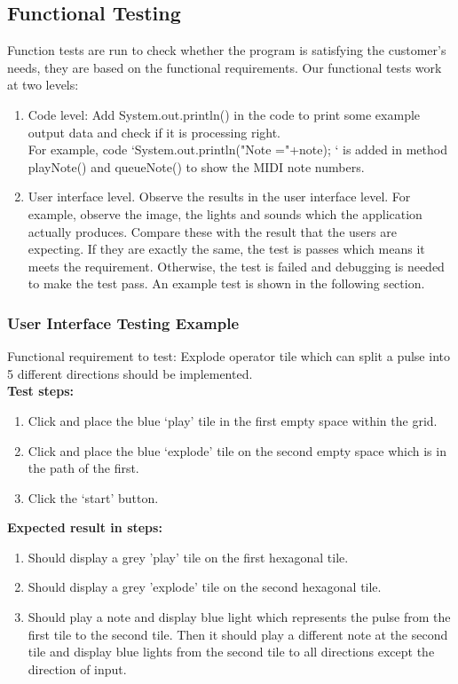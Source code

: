 \documentclass[10pt,a4paper]{article}
\begin{document}
\subsection{Functional Testing}
Function tests are run to check whether the program is satisfying the customer's needs, they are based on the functional requirements. Our functional tests work at two levels:
\begin{enumerate}
\item Code level: Add System.out.println() in the code to print some example output data and check if it is processing right.\\
For example, code ‘System.out.println("Note ="+note); ‘ is added in method playNote() and queueNote() to show the MIDI note numbers.
\item  User interface level. Observe the results in the user interface level. For example, observe the image, the lights and sounds which the application actually produces. Compare these with the result that the users are expecting. If they are exactly the same, the test is passes which means it meets the requirement. Otherwise, the test is failed and debugging is needed to make the test pass. An example test is shown in the following section.
\end{enumerate}

\subsubsection{User Interface Testing Example}

Functional requirement to test: Explode operator tile which can split a pulse into 5 different directions should be implemented.\\

\textbf{Test steps:}
\begin{enumerate}
\item Click and place the blue ‘play’ tile in the first empty space within the grid.

\item Click and place the blue ‘explode’ tile on the second empty space which is in the path of the first.

\item Click the ‘start’ button.
\end{enumerate}

\textbf{Expected result in steps:}
\begin{enumerate}
\item Should display a grey 'play' tile on the first hexagonal tile.

\item Should display a grey 'explode' tile on the second hexagonal tile.

\item Should play a note and display blue light which represents the pulse from the first tile to the second tile. Then it should play a different note at the second tile and display blue lights from the second tile to all directions except the direction of input.
\end{enumerate}
\end{document}
